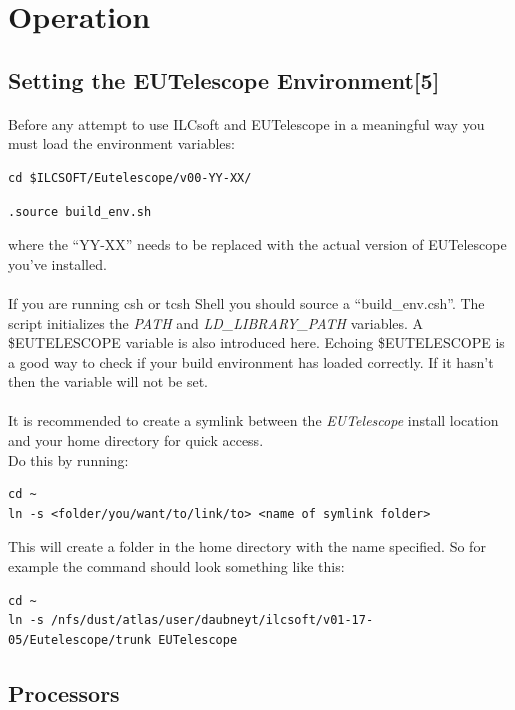 \documentclass[11pt]{article}
\begin{document}
\section{Operation}
\subsection{Setting the EUTelescope Environment[5]}
\paragraph{}
Before any attempt to use ILCsoft and EUTelescope in a meaningful way you must load the environment variables:\\
\begin{verbatim}
cd $ILCSOFT/Eutelescope/v00-YY-XX/
\end{verbatim}
\begin{verbatim}
.source build_env.sh
\end{verbatim}
where the ``YY-XX'' needs to be replaced with the actual version of EUTelescope you've installed.
\paragraph{}
If you are running csh or tcsh Shell you should source a ``build\_env.csh''. The script initializes the \textit{PATH} and \textit{LD\_LIBRARY\_PATH} variables. A \$EUTELESCOPE variable is also introduced here. Echoing \$EUTELESCOPE is a good way to check if your build environment has loaded correctly. If it hasn't then the variable will not be set.
\paragraph{}
It is recommended to create a symlink between the \textit{EUTelescope} install location and your home directory for quick access.\\ 
Do this by running: 
\begin{verbatim}
cd ~
ln -s <folder/you/want/to/link/to> <name of symlink folder>
\end{verbatim}
This will create a folder in the home directory with the name specified. So for example the command should look something like this:
\begin{verbatim}
cd ~
ln -s /nfs/dust/atlas/user/daubneyt/ilcsoft/v01-17-05/Eutelescope/trunk EUTelescope
\end{verbatim}
\subsection{Processors}
\end{document}
